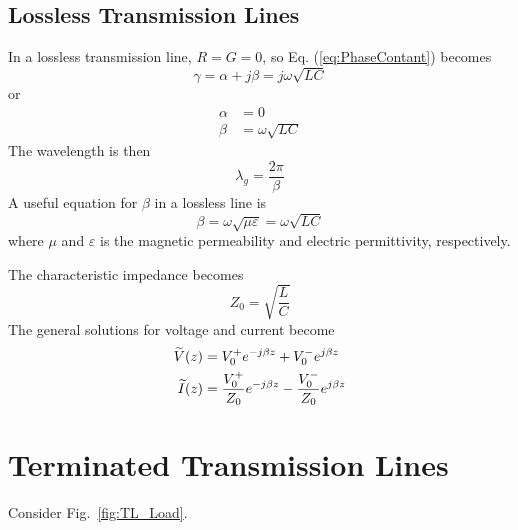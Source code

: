 \subsection{Lossless Transmission Lines} \label{sec:LosslessLines}
In a lossless transmission line, $R = G = 0$, so Eq. (\ref{eq:PhaseContant}) becomes 
\begin{equation}
    \gamma = \alpha + j\beta = j\omega\sqrt{LC}
\end{equation}
 or
\begin{subequations}
\begin{align}
    \alpha &= 0 \\ 
    \beta &= \omega\sqrt{LC}
\end{align}
\end{subequations}
The wavelength is then 
\begin{equation}
    \lambda_g = \dfrac{2\pi}{\beta} 
\end{equation}
A useful equation for $\beta$ in a lossless line is 
\begin{equation}
    \beta = \omega\sqrt{\mu\varepsilon} = \omega\sqrt{LC}
\end{equation}
where $\mu$ and $\varepsilon$ is the magnetic permeability and electric permittivity, respectively. \par 

The characteristic impedance becomes 
\begin{equation}
    Z_0 = \sqrt{\dfrac{L}{C}} 
\end{equation}
The general solutions for voltage and current become 
\begin{subequations} 
\begin{align}
    \widetilde{V}(z) &= V_0^+ e^{-j\beta z} + V_0^- e^{j\beta z} \\ 
    \widetilde{I}(z) &= \dfrac{V_0^+}{Z_0} e^{-j\beta z} - \dfrac{V_0^-}{Z_0} e^{j\beta z}
\end{align}
\end{subequations}

\section{Terminated Transmission Lines} \label{sec:TerminatedLines}
Consider Fig.\ \ref{fig:TL_Load}.

